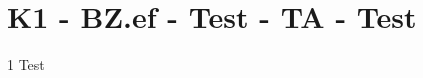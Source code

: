 \section{K1 - BZ.ef - Test - TA - Test}

\begin{langesbeispiel} \item[1] %
Test
\end{langesbeispiel}